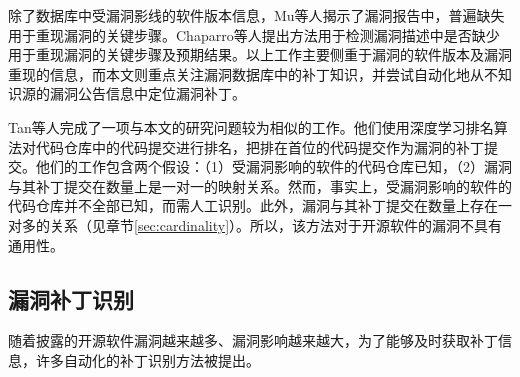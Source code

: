 除了数据库中受漏洞影线的软件版本信息，Mu等人\cite{mu2018understanding}揭示了漏洞报告中，普遍缺失用于重现漏洞的关键步骤。Chaparro等人\cite{chaparro2017detecting}提出方法用于检测漏洞描述中是否缺少用于重现漏洞的关键步骤及预期结果。以上工作主要侧重于漏洞的软件版本及漏洞重现的信息，而本文则重点关注漏洞数据库中的补丁知识，并尝试自动化地从不知识源的漏洞公告信息中定位漏洞补丁。

Tan等人完成了一项与本文的研究问题较为相似的工作\cite{Tan2021locating}。他们使用深度学习排名算法对代码仓库中的代码提交进行排名，把排在首位的代码提交作为漏洞的补丁提交。他们的工作包含两个假设：（1）受漏洞影响的软件的代码仓库已知，（2）漏洞与其补丁提交在数量上是一对一的映射关系。然而，事实上，受漏洞影响的软件的代码仓库并不全部已知，而需人工识别。此外，漏洞与其补丁提交在数量上存在一对多的关系（见章节\ref{sec:cardinality}）。所以，该方法对于开源软件的漏洞不具有通用性。




\subsection{漏洞补丁识别}
随着披露的开源软件漏洞越来越多、漏洞影响越来越大，为了能够及时获取补丁信息，许多自动化的补丁识别方法被提出。

